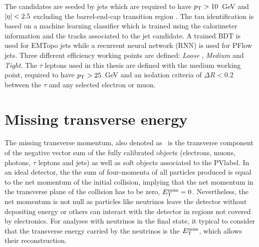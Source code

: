 The candidates are seeded by jets which are required to have $p_{\text{T}} > 10$~GeV and $\abs{\eta} < 2.5$ excluding the barrel-end-cap transition region %
. The tau identification is based on a machine learning classifier which is trained using the calorimeter information and the tracks associated to the jet candidate. A trained BDT is used for EMTopo jets while a recurrent neural network (RNN) is used for PFlow jets. Three different efficiency working points are defined: \textit{Loose
}, \textit{Medium} and \textit{Tight}. The $\tau$ leptons used in this thesis are defined with the medium working point, required to have $p_{\text{T}}>25$~GeV and an isolation criteria of $\Delta R<0.2$ between the $\tau$ and any selected electron or muon.

\section{Missing transverse energy}

The missing transverse momentum, also denoted as \MET\ is the transverse component of the negative vector sum of the fully calibrated objects (electrons, muons, photons, $\tau$ leptons and jets) as well
as soft objects associated to the \acrshort{PVlabel}. In an ideal detector, the the sum of four-momenta of all particles produced is equal to the net momentum of the initial collision, implying that the net momentum in the transverse plane of the collision has to be zero, $E_{\text{T}}^{\text{miss}}=0$. Nevertheless, the net momentum is not null as particles like neutrinos leave the detector without depositing energy or others can interact with the detector in regions not covered by electronics. For analyses with neutrinos in the final state, it typical to consider that the transverse energy carried by the neutrinos is the $E_{\text{T}}^{\text{miss}}$, which allows their reconstruction.